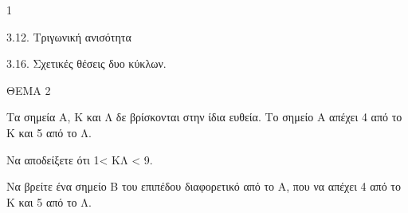 \begin{ylh}{1}
    \item 3.12. Τριγωνική ανισότητα
    \item 3.16. Σχετικές θέσεις δυο κύκλων.
\end{ylh}

ΘΕΜΑ 2

Τα σημεία Α, Κ και Λ δε βρίσκονται στην ίδια ευθεία. Το σημείο Α απέχει 4 από το Κ και 5 από το Λ.

\begin{alist}
\item Να αποδείξετε ότι 1\textless{} ΚΛ \textless{} 9. 

\item Να βρείτε ένα σημείο Β του επιπέδου διαφορετικό από το Α, που να απέχει 4 από το Κ και 5 από το Λ. 


\end{alist}
